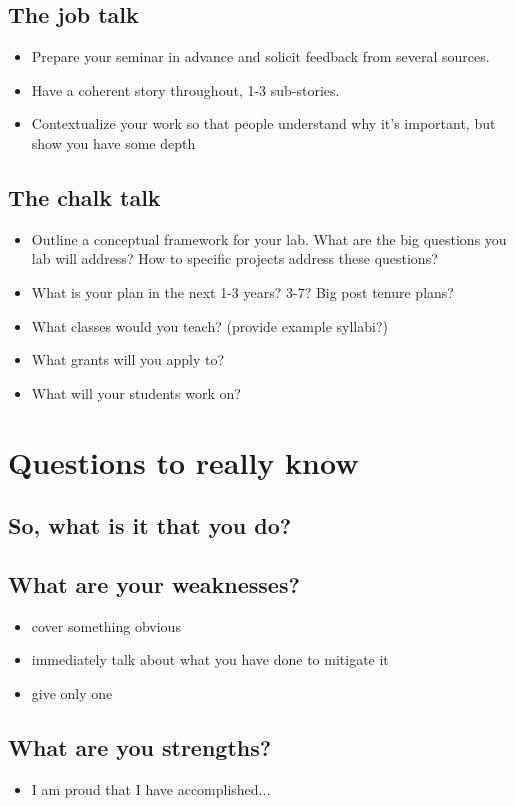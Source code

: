 \documentclass[12pt]{article}
\begin{document}
\subsection{The job talk}
\begin{itemize}
\item Prepare your seminar in advance and solicit feedback from
  several sources.
\item Have a coherent story throughout, 1-3 sub-stories.
\item Contextualize your work so that people understand why it's
  important, but show you have some depth
\end{itemize}

\subsection{The chalk talk}
\begin{itemize}
\item Outline a conceptual framework for your lab. What are the big
  questions you lab will address? How to specific projects address
  these questions?
\item What is your plan in the next 1-3 years? 3-7? Big post tenure
  plans?
\item What classes would you teach? (provide example syllabi?)
\item What grants will you apply to?
\item What will your students work on?
\end{itemize}

\section{Questions to really know}
\subsection{So, what is it that you do?}
\subsection{What are your weaknesses?}
\begin{itemize}
\item cover something obvious
\item immediately talk about what you have done to mitigate it
\item give only one
\end{itemize}

\subsection{What are you strengths?}
\begin{itemize}
\item I am proud that I have accomplished...
\end{itemize}
\end{document}
